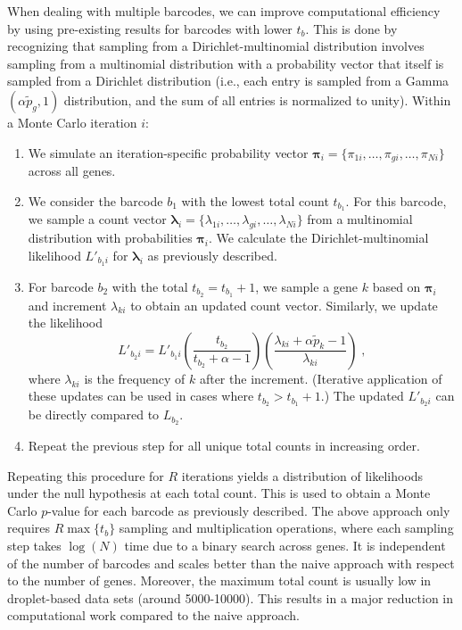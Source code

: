 \documentclass{article}
\begin{document}
When dealing with multiple barcodes, we can improve computational efficiency by using pre-existing results for barcodes with lower $t_b$.
This is done by recognizing that sampling from a Dirichlet-multinomial distribution involves sampling from a multinomial distribution with a probability vector that itself is sampled from a Dirichlet distribution (i.e., each entry is sampled from a Gamma$(\alpha\tilde{p}_g, 1)$ distribution, and the sum of all entries is normalized to unity).
Within a Monte Carlo iteration $i$:
\begin{enumerate}
\item We simulate an iteration-specific probability vector $\pmb{\pi}_i = \{ \pi_{1i}, \ldots, \pi_{gi}, \ldots, \pi_{Ni} \}$ across all genes.
\item We consider the barcode $b_1$ with the lowest total count $t_{b_1}$. 
For this barcode, we sample a count vector $\pmb{\lambda}_{i} = \{ \lambda_{1i}, \ldots, \lambda_{gi}, \ldots, \lambda_{Ni} \}$ from a multinomial distribution with probabilities $\pmb{\pi}_i$. 
We calculate the Dirichlet-multinomial likelihood $L'_{b_1i}$ for $\pmb{\lambda}_{i}$ as previously described.
\item For barcode $b_2$ with the total $t_{b_2}=t_{b_1}+1$, we sample a gene $k$ based on $\pmb{\pi}_i$ and increment $\lambda_{ki}$ to obtain an updated count vector.
Similarly, we update the likelihood 
\[
    L'_{b_2i} = L'_{b_1i} \left( \frac{t_{b_2}}{t_{b_2} + \alpha - 1} \right) \left( \frac{\lambda_{ki} + \alpha\tilde{p}_k - 1}{\lambda_{ki}} \right) \;,
\]
where $\lambda_{ki}$ is the frequency of $k$ after the increment.
(Iterative application of these updates can be used in cases where $t_{b_2} > t_{b_1}+1$.)
The updated $L'_{b_2i}$ can be directly compared to $L_{b_2}$.
\item Repeat the previous step for all unique total counts in increasing order.
\end{enumerate}
Repeating this procedure for $R$ iterations yields a distribution of likelihoods under the null hypothesis at each total count.
This is used to obtain a Monte Carlo $p$-value for each barcode as previously described.
The above approach only requires $R \max\{t_b\}$ sampling and multiplication operations, where each sampling step takes $\log(N)$ time due to a binary search across genes.
It is independent of the number of barcodes and scales better than the naive approach with respect to the number of genes.
Moreover, the maximum total count is usually low in droplet-based data sets (around 5000-10000).
This results in a major reduction in computational work compared to the naive approach.
\end{document}
